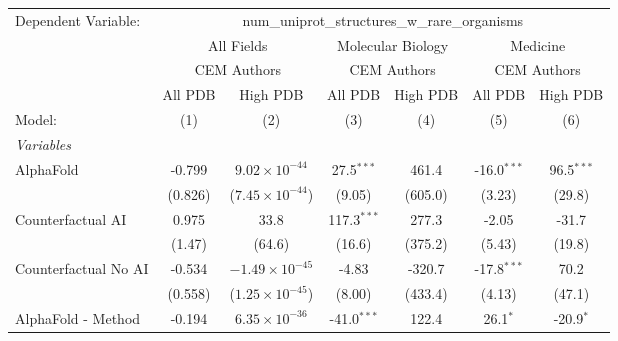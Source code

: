 \begingroup
\centering
\begin{tabular}{lcccccc}
   \tabularnewline \midrule \midrule
   Dependent Variable: & \multicolumn{6}{c}{num\_uniprot\_structures\_w\_rare\_organisms}\\
 & \multicolumn{2}{c}{All Fields} & \multicolumn{2}{c}{Molecular Biology} & \multicolumn{2}{c}{Medicine} \\
\cmidrule(lr){2-3} \cmidrule(lr){4-5} \cmidrule(lr){6-7}
 & \multicolumn{2}{c}{CEM Authors} & \multicolumn{2}{c}{CEM Authors} & \multicolumn{2}{c}{CEM Authors} \\
\cmidrule(lr){2-3} \cmidrule(lr){4-5} \cmidrule(lr){6-7}
 & \multicolumn{1}{c}{All PDB} & \multicolumn{1}{c}{High PDB} & \multicolumn{1}{c}{All PDB} & \multicolumn{1}{c}{High PDB} & \multicolumn{1}{c}{All PDB} & \multicolumn{1}{c}{High PDB} \\
\cmidrule(lr){2-2} \cmidrule(lr){3-3} \cmidrule(lr){4-4} \cmidrule(lr){5-5} \cmidrule(lr){6-6} \cmidrule(lr){7-7}
   Model:                                                     & (1)          & (2)                      & (3)            & (4)     & (5)           & (6)\\  
   \midrule
   \emph{Variables}\\
   AlphaFold                                                  & -0.799       & $9.02\times 10^{-44}$    & 27.5$^{***}$   & 461.4   & -16.0$^{***}$ & 96.5$^{***}$\\   
                                                              & (0.826)      & ($7.45\times 10^{-44}$)  & (9.05)         & (605.0) & (3.23)        & (29.8)\\   
   Counterfactual AI                                          & 0.975        & 33.8                     & 117.3$^{***}$  & 277.3   & -2.05         & -31.7\\   
                                                              & (1.47)       & (64.6)                   & (16.6)         & (375.2) & (5.43)        & (19.8)\\   
   Counterfactual No AI                                       & -0.534       & $-1.49\times 10^{-45}$   & -4.83          & -320.7  & -17.8$^{***}$ & 70.2\\   
                                                              & (0.558)      & ($1.25\times 10^{-45}$)  & (8.00)         & (433.4) & (4.13)        & (47.1)\\   
   AlphaFold - Method                                         & -0.194       & $6.35\times 10^{-36}$    & -41.0$^{***}$  & 122.4   & 26.1$^{*}$    & -20.9$^{*}$\\   

\end{tabular}
